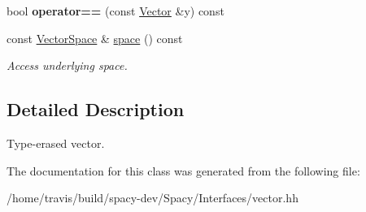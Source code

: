 \begin{DoxyCompactItemize}
\item 
\hypertarget{classSpacy_1_1Vector_a0d634e69572e8da07c3c7056ec911208}{bool {\bfseries operator==} (const \hyperlink{classSpacy_1_1Vector}{\-Vector} \&y) const }\label{classSpacy_1_1Vector_a0d634e69572e8da07c3c7056ec911208}

\item 
\hypertarget{classSpacy_1_1Vector_a8a549d4ed045ddf563afca5bc942397b}{const \hyperlink{classSpacy_1_1VectorSpace}{\-Vector\-Space} \& \hyperlink{classSpacy_1_1Vector_a8a549d4ed045ddf563afca5bc942397b}{space} () const }\label{classSpacy_1_1Vector_a8a549d4ed045ddf563afca5bc942397b}

\begin{DoxyCompactList}\small\item\em \-Access underlying space. \end{DoxyCompactList}\end{DoxyCompactItemize}


\subsection{\-Detailed \-Description}
\-Type-\/erased vector. 

\-The documentation for this class was generated from the following file\-:\begin{DoxyCompactItemize}
\item 
/home/travis/build/spacy-\/dev/\-Spacy/\-Interfaces/vector.\-hh\end{DoxyCompactItemize}

